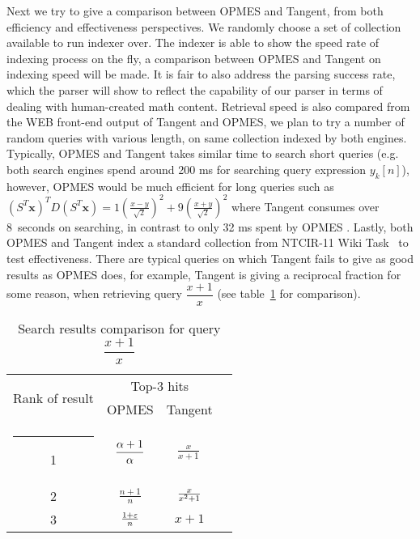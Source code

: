 \documentclass{llncs}
\makeatletter
\newcommand{\thickhline}{%
    \noalign {\ifnum 0=`}\fi \hrule height 1pt
    \futurelet \reserved@a \@xhline
}
\renewcommand{\arraystretch}{1.6}
\makeatother
\begin{document}
Next we try to give a comparison between OPMES and Tangent, from both efficiency and effectiveness perspectives.
We randomly choose a set of collection available to run indexer over.
The indexer is able to show  the speed rate of indexing process on the fly, a comparison between OPMES and Tangent on indexing speed will be made.
It is fair to also address the parsing success rate, which the parser will show to reflect the capability of our parser in terms of dealing with human-created math content.
Retrieval speed is also compared from the WEB front-end output of Tangent and OPMES, we plan to try a number of random queries with various length, on same collection indexed by both engines. 
Typically, OPMES and Tangent takes similar time to search short queries (e.g. both search engines spend around 200 ms for searching query expression $y_{k}[n]$), 
however, OPMES would be much efficient for long queries such as $(S^{T}\mathbf{x})^{T}D(S^{T} \mathbf{x})=1\left(\frac{x-y}{\sqrt{2}}\right)^{2}+9\left(\frac{x+y}{\sqrt{2}} \right)^{2}$ where Tangent consumes over 8~seconds on searching, in contrast to only 32 ms spent by OPMES .
Lastly, both OPMES and Tangent index a standard collection from NTCIR-11 Wiki Task~\cite{ov} to test effectiveness.
There are typical queries on which Tangent fails to give as good results as OPMES does, for example, Tangent is giving a reciprocal fraction for some reason, when retrieving query $\dfrac {x+1}x$ (see table~\ref{comp1} for comparison).
\begin{table}
\begin{minipage}[b]{4.5in}
\caption{Search results comparison for query $\dfrac{x+1}x$} 
\label{comp1}
\begin{center}
\renewcommand{\arraystretch}{2.0}
\begin{tabular}{cccc}
\multirow{2}{*}{Rank of result} & \multicolumn{2}{c}{Top-3 hits} \\
\cline{2-3}
& OPMES & Tangent \\
\thickhline
1 & ${\displaystyle{\alpha+1\over\alpha}}$               & $\frac{x}{x+1}\,$        \\ \hline
2 & ${\displaystyle{\tfrac{n+1}{n}}} $                   & ${x\over x^{2}+1}$       \\ \hline
3 & ${\displaystyle\textstyle{\frac{1+\varepsilon}{n}}}$ & $x + 1$                  \\ \hline
\end{tabular}
\renewcommand{\arraystretch}{1}
\end{center}
\end{minipage}
\end{table}
\end{document}
